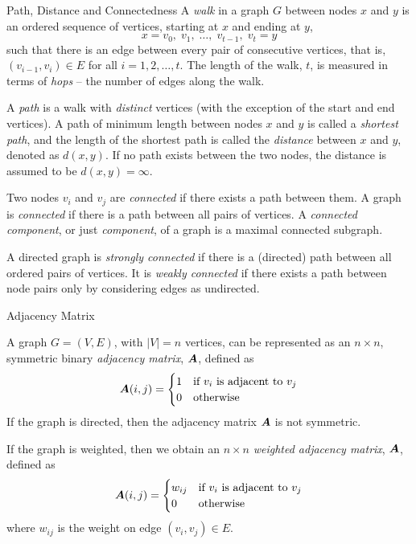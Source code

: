 \begin{frame}{Path, Distance and Connectedness}
  \small
A {\em walk} in a graph $G$ between
nodes $x$ and $y$ is an ordered sequence of vertices, starting at
$x$ and ending at $y$,
$$x= v_0,\; v_1,\; \ldots,\; v_{t-1},\; v_t=y$$
such that there is
an edge between every pair of consecutive vertices,
that is, ${(v_{i-1}, v_i) \in E}$ for all $i=1, 2, \ldots, t$.  
The
length of the walk, $t$, is measured in terms of {\em hops} --
the number of edges along the walk.  

\medskip
A {\em path} is a walk with {\em distinct} vertices (with the
exception of the start and end vertices). 
A path of minimum length between nodes
$x$ and $y$ is called a {\em
shortest path}, and the length of the shortest path is called
the {\em distance} between $x$ and $y$, denoted as $d(x,y)$.  If
no path exists between the two nodes, the distance is assumed to
be $d(x,y) = \infty$.

\medskip
Two nodes $v_i$ and $v_{j}$ are 
{\em connected} if there exists a path between them.  A graph
is {\em connected} if there is a path between all pairs of
vertices. A {\em connected component}, or just {\em component},
of a graph is a maximal connected subgraph. 

\medskip
A directed graph is {\em strongly connected}
if there is a (directed) path between all ordered pairs of
vertices. It is {\em weakly connected} if there
exists a path between node pairs only by considering edges as
undirected.
\end{frame}


\begin{frame}{Adjacency Matrix}

A graph $G=(V,E)$, with $|V|=n$ vertices, can be
represented as an $n \times n$, symmetric binary {\em
adjacency matrix}, ${\boldsymbol A}$, def\/{i}ned as
\begin{align*}
    {\boldsymbol A}(i,j) =
    \begin{cases}
        1 & \text{if } v_i \text{ is adjacent to } v_{j}\\
        0 & \text{otherwise}
    \end{cases}
\end{align*}
If the graph is
directed, then the adjacency matrix ${\boldsymbol A}$ is not symmetric.
%

\bigskip
If the graph is weighted, then we obtain an
$n \times n$ {\em weighted adjacency matrix}, ${\boldsymbol A}$, def\/{i}ned as
\begin{align*}
    {\boldsymbol A}(i,j) = \begin{cases}
        w_{ij} & \text{if } v_i \text{ is adjacent to } v_{j}\\
        0 & \text{otherwise}
    \end{cases}
\end{align*}
where $w_{ij}$ is the weight on edge $(v_i, v_{j}) \in E$.
\end{frame}


